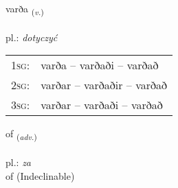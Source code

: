 \documentclass[frontgrid, backgrid]{flacards}\usepackage[]{graphicx}\usepackage[]{xcolor}
\begin{document}
\renewcommand{\blhead}{\vskip5pt {\small\bfseries\footnotesize Sagnorð | czasownik }}
\renewcommand{\bcfoot}{\vskip5pt \hspace{2pt}{\small\bfseries\footnotesize 1K}}


{varða \small{\textsubscript{(\textit{v.})}} \\[1ex] %
\textphonetic{[varða]} \\
pl.: \emph{dotyczyć} \\  [2ex]
\renewcommand*{\arraystretch}{0.8}
\begin{tabular}{p{1cm}l}
\textsc{1sg}: & varða -- varðaði -- varðað \\ 
\textsc{2sg}: & varðar -- varðaðir -- varðað \\ 
\textsc{3sg}: & varðar -- varðaði -- varðað \\ 
\end{tabular}
}


\renewcommand{\flhead}{\vskip5pt \fboxsep=0pt {\small\bfseries\footnotesize Atviksorð | przysłówek}}
\renewcommand{\fcfoot}{\vskip5pt \fboxsep=0pt \hspace{2pt}{\small\bfseries\footnotesize 1K}}

\renewcommand{\blhead}{\vskip5pt {\small\bfseries\footnotesize Atviksorð | przysłówek }}
\renewcommand{\bcfoot}{\vskip5pt \hspace{2pt}{\small\bfseries\footnotesize 1K}}


{of \small{\textsubscript{(\textit{adv.})}} \\[1ex]
\textphonetic{[ɔːv]} \\
pl.: \emph{za} \\  [2ex]
of (Indeclinable)}

\renewcommand{\flhead}{\vskip5pt \fboxsep=0pt {\small\bfseries\footnotesize Lýsingarorð | przymiotnik}}
\renewcommand{\fcfoot}{\vskip5pt \fboxsep=0pt \hspace{2pt}{\small\bfseries\footnotesize 1K}}

\renewcommand{\blhead}{\vskip5pt {\small\bfseries\footnotesize Lýsingarorð | przymiotnik }}
\renewcommand{\bcfoot}{\vskip5pt \hspace{2pt}{\small\bfseries\footnotesize 1K}}
\end{document}
